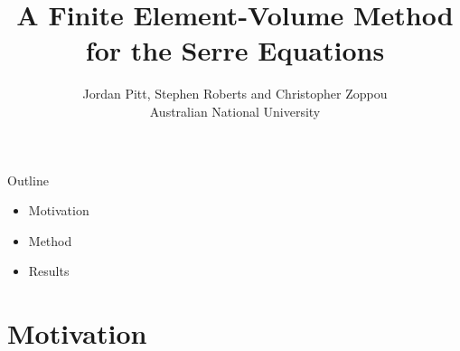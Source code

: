 \documentclass[pdf]{beamer}
\title{A Finite Element-Volume Method for the Serre Equations}
\author{Jordan Pitt, Stephen Roberts and Christopher Zoppou \\ Australian National University}
\begin{document}
\begin{frame}
\titlepage
\end{frame}

 
\begin{frame}{Outline}
\begin{itemize}
	\pause
	\item Motivation
	\pause
	\item Method
	\pause
	\item Results
\end{itemize}
\end{frame}
\section{Motivation}
\end{document}
